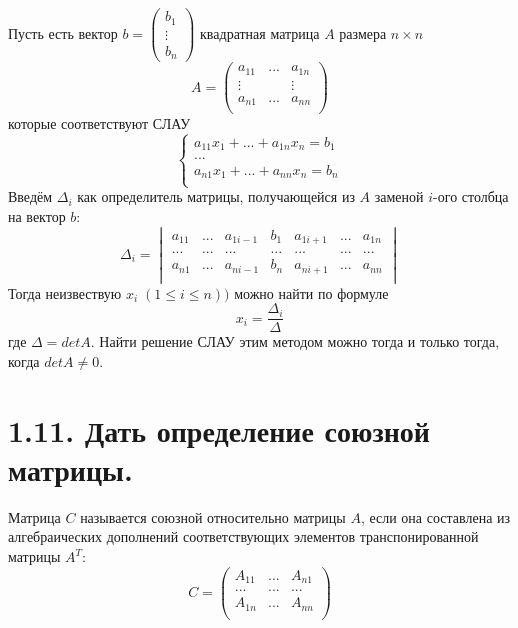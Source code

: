 \documentclass{article}
\begin{document}
Пусть есть вектор $b = \begin{pmatrix} b_1 \\ \vdots \\ b_n \end{pmatrix}$ квадратная матрица $A$ размера $n \times n$
$$
A = 
\begin{pmatrix}
a_{11} & ... & a_{1n} \\
\vdots &  & \vdots \\
a_{n1} & ... & a_{nn} \\
\end{pmatrix}
$$
которые соответствуют СЛАУ
$$
\begin{cases}
a_{11}x_1 + ... + a_{1n}x_n = b_1 \\
... \\
a_{n1}x_1 + ... + a_{nn}x_n = b_n \\
\end{cases}
$$
Введём $\Delta_i$ как определитель матрицы, получающейся из $A$ заменой $i$-ого столбца на вектор $b$:
$$
\Delta_i = 
\begin{vmatrix}
a_{11} & ... & a_{1i-1} & b_1 & a_{1i+1} & ... & a_{1n} \\
... & ... & ... & ... & ... & ... & ... \\
a_{n1} & ... & a_{ni-1} & b_n & a_{ni+1} & ... & a_{nn} \\
\end{vmatrix}
$$
Тогда неизвествую $x_i \; (1 \le i \le n))$ можно найти по формуле
$$
x_i = \frac{\Delta_i}{\Delta}
$$
где $\Delta = detA$.
\newline Найти решение СЛАУ этим методом можно тогда и только тогда, когда 
\newline $detA \ne 0$.

\section*{\LARGE 1.11. Дать определение союзной матрицы.  }

Матрица $C$ называется союзной относительно матрицы $A$, если она составлена из алгебраических дополнений соответствующих элементов транспонированной матрицы $A^T$:
$$
C = 
\begin{pmatrix}
A_{11} & ... & A_{n1} \\
... & ... & ... \\
A_{1n} & ... & A_{nn} \\
\end{pmatrix}
$$
\end{document}
